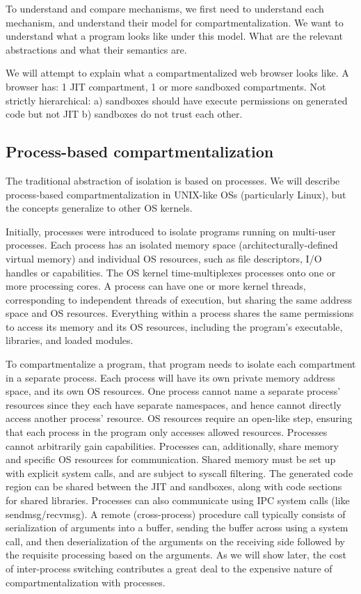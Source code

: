 To understand and compare mechanisms, we first need to understand each 
mechanism, and understand their model for compartmentalization.
We want to understand what a program looks like under this model.
What are the relevant abstractions and what their semantics are.

We will attempt to explain what a compartmentalized web browser looks like.
A browser has: 1 JIT compartment, 1 or more sandboxed compartments.
Not strictly hierarchical:
a) sandboxes should have execute permissions on generated code but not JIT
b) sandboxes do not trust each other.


\subsection{Process-based compartmentalization}

The traditional abstraction of isolation is based on processes.
We will describe process-based compartmentalization in UNIX-like OSs
(particularly Linux), 
but the concepts generalize to other OS kernels.

Initially, processes were introduced to isolate programs running on multi-user
processes.
Each process has an isolated memory space (architecturally-defined virtual memory)
and individual OS resources, such as file descriptors, I/O handles or capabilities.
The OS kernel time-multiplexes processes onto one or more processing cores.
A process can have one or more kernel threads, corresponding to independent threads
of execution, but sharing the same address space and OS resources.
Everything within a process shares the same permissions to access its memory and
its OS resources, including the program's executable, libraries, and loaded modules.

To compartmentalize a program, that program needs to isolate each compartment in
a separate process.
Each process will have its own private memory address space, and its own 
OS resources.
One process cannot name a separate process' resources since they each have separate
namespaces, and hence cannot directly access another process' resource.
OS resources require an open-like step, ensuring that each process in the program
only accesses allowed resources.
Processes cannot arbitrarily gain capabilities.
Processes can, additionally, share memory and specific OS resources for 
communication.
Shared memory must be set up with explicit system calls, and are subject to 
syscall filtering.
The generated code region can be shared between the JIT and sandboxes, along
with code sections for shared libraries.
Processes can also communicate using IPC system calls (like sendmsg/recvmsg).
A remote (cross-process) procedure call typically consists of serialization of
arguments into a buffer, sending the buffer across using a system call,
and then deserialization of the arguments on the receiving side followed by
the requisite processing based on the arguments.
As we will show later, the cost of inter-process switching contributes a great
deal to the expensive nature of compartmentalization with processes.

